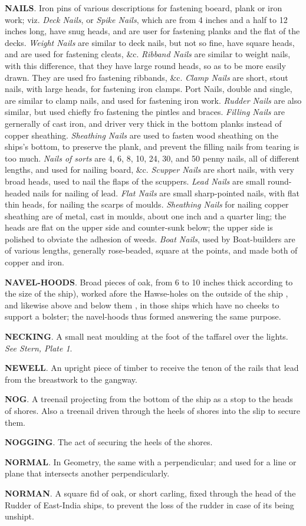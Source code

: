 \textbf{NAILS}. Iron pins of various descriptions for fastening boeard, plank or iron work; viz. \textit{Deck Nails}, or \textit{Spike Nails}, which are from 4 inches and a half to 12 inches long, have snug heads, and are user for fastening planks and the flat of the decks. \textit{Weight Nails} are similar to deck nails, but not so fine, have square heads, and are used for fastening cleats, \&c. \textit{Ribband Nails} are similar to weight nails, with this difference, that they have large round heads, so as to be more easily drawn. They are used fro fastening ribbands, \&c. \textit{Clamp Nails} are short, stout nails, with large heads, for fastening iron clamps. Port Nails, double and single, are similar to clamp nails, and used for fastening iron work. \textit{Rudder Nails} are also similar, but used chiefly fro fastening the pintles and braces. \textit{Filling Nails} are gernerally of cast iron, and driver very thick in the bottom planks instead of copper sheathing. \textit{Sheathing Nails} are used to fasten wood sheathing on the ships's bottom, to preserve the plank, and prevent the filling nails from tearing is too much. \textit{Nails of sorts} are 4, 6, 8, 10, 24, 30, and 50 penny nails, all of different lengths, and used for nailing board, \&c. \textit{Scupper Nails} are short nails, with very broad heads, used to nail the flaps of the scuppers. \textit{Lead Nails} are small round-headed nails for nailing of lead. \textit{Flat Nails} are small sharp-pointed nails, with flat thin heads, for nailing the scarps of moulds. \textit{Sheathing Nails} for nailing copper sheathing are of metal, cast in moulds, about one inch and a quarter ling; the heads are flat on the upper side and counter-sunk below; the upper side is polished to obviate the adhesion of weeds. \textit{Boat Nails}, used by Boat-builders are of various lengths, generally rose-beaded, square at the points, and made both of copper and iron.

\textbf{NAVEL-HOODS}. Broad pieces of oak, from 6 to 10 inches thick according to the size of the ship), worked afore the Hawse-holes on the outside of the ship , and likewise above and below them , in those ships which have no cheeks to support a bolster; the navel-hoods thus formed answering the same purpose.

\textbf{NECKING}. A small neat moulding at the foot of the taffarel over the lights. \textit{See Stern, Plate 1}. 

\textbf{NEWELL}. An upright piece of timber to receive the tenon of the rails that lead from the breastwork to the gangway. 

\textbf{NOG}. A treenail projecting from the bottom of the ship as a stop to the heads of shores. Also a treenail driven through the heels of shores into the slip to secure them. 

\textbf{NOGGING}. The act of securing the heels of the shores.

\textbf{NORMAL}. In Geometry, the same with a perpendicular; and used for a line or plane that intersects another perpendicularly. 

\textbf{NORMAN}. A square fid of oak, or short carling, fixed through the head of the Rudder of East-India ships, to prevent the loss of the rudder in case of its being unshipt.

